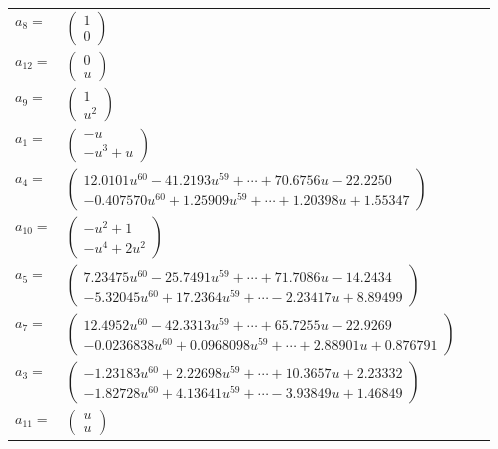 \documentclass[1p]{elsarticle_modified}
\theoremstyle{definition}
\begin{document}
\begin{tabular}{m{7pt} m{180pt} m{7pt} m{180pt} }
\flushright $a_{8}=$&$\begin{pmatrix}1\\0\end{pmatrix}$ \\
\flushright $a_{12}=$&$\begin{pmatrix}0\\u\end{pmatrix}$ \\
\flushright $a_{9}=$&$\begin{pmatrix}1\\u^2\end{pmatrix}$ \\
\flushright $a_{1}=$&$\begin{pmatrix}- u\\- u^3+u\end{pmatrix}$ \\
\flushright $a_{4}=$&$\begin{pmatrix}12.0101 u^{60}-41.2193 u^{59}+\cdots+70.6756 u-22.2250\\-0.407570 u^{60}+1.25909 u^{59}+\cdots+1.20398 u+1.55347\end{pmatrix}$ \\
\flushright $a_{10}=$&$\begin{pmatrix}- u^2+1\\- u^4+2 u^2\end{pmatrix}$ \\
\flushright $a_{5}=$&$\begin{pmatrix}7.23475 u^{60}-25.7491 u^{59}+\cdots+71.7086 u-14.2434\\-5.32045 u^{60}+17.2364 u^{59}+\cdots-2.23417 u+8.89499\end{pmatrix}$ \\
\flushright $a_{7}=$&$\begin{pmatrix}12.4952 u^{60}-42.3313 u^{59}+\cdots+65.7255 u-22.9269\\-0.0236838 u^{60}+0.0968098 u^{59}+\cdots+2.88901 u+0.876791\end{pmatrix}$ \\
\flushright $a_{3}=$&$\begin{pmatrix}-1.23183 u^{60}+2.22698 u^{59}+\cdots+10.3657 u+2.23332\\-1.82728 u^{60}+4.13641 u^{59}+\cdots-3.93849 u+1.46849\end{pmatrix}$ \\
\flushright $a_{11}=$&$\begin{pmatrix}u\\u\end{pmatrix}$ \\

\end{tabular}
\end{document}

